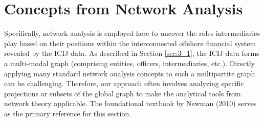 \section{Concepts from Network Analysis}
\label{subsec:network_theory_concepts}

Specifically, network analysis is employed here to uncover the roles intermediaries play based on their positions within the interconnected offshore financial system revealed by the ICIJ data. As described in Section \ref{sec:3_1}, the ICIJ data forms a multi-modal graph (comprising entities, officers, intermediaries, etc.). Directly applying many standard network analysis concepts to such a multipartite graph can be challenging. Therefore, our approach often involves analyzing specific projections or subsets of the global graph to make the analytical tools from network theory applicable. The foundational textbook by Newman (2010) serves as the primary reference for this section.

